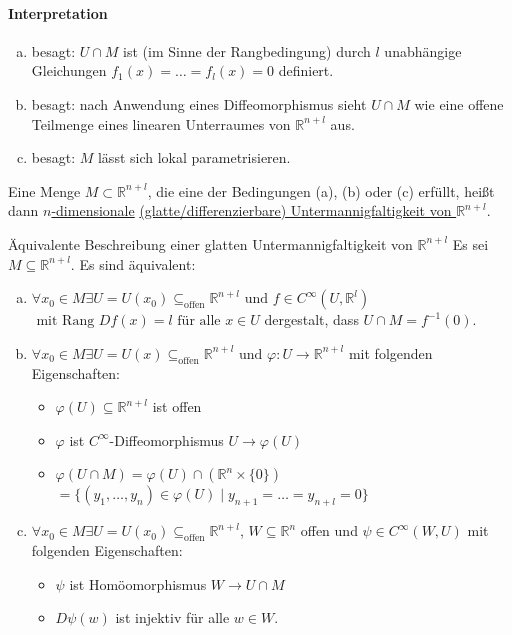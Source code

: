 \documentclass[a4paper,11pt,notitlepage]{report}
\theoremstyle{definition}
\newcommand{\R}{{\ensuremath{\mathbb{R}}}}
\newenvironment{definition}[1]{
	\begin{definitions}
	\marginnote{\emph{#1}}
}{\end{definitions}}
\begin{document}
\paragraph{Interpretation}
\begin{enumerate}[(a)]
	\item besagt: $U \cap M$ ist (im Sinne der Rangbedingung) durch $l$ unabhängige Gleichungen $f_1(x) = \ldots = f_l(x) = 0$ definiert.
	\item besagt: nach Anwendung eines Diffeomorphismus sieht $U \cap M$ wie eine offene Teilmenge eines linearen Unterraumes von $\R^{n+l}$ aus.
	\item besagt: $M$ lässt sich lokal parametrisieren.
\end{enumerate}

\begin{definition}{Untermannigfaltigkeit}
Eine Menge $M \subset \R^{n+l}$, die eine der Bedingungen (a), (b) oder (c) erfüllt, heißt dann \underline{$n$-dimensionale} \underline{(glatte/differenzierbare) Untermannigfaltigkeit von $\R^{n+l}$}.
\end{definition}


\begin{theorem}{Äquivalente Beschreibung einer glatten Untermannigfaltigkeit von $\R^{n+l}$}
	Es sei $M \subseteq \R^{n+l}$. Es sind äquivalent:
	\begin{enumerate}[(a)]
		\item $\forall x_0 \in M \exists U = U(x_0) \subseteq_{\text{offen}} \R^{n+l} \text{ und } f \in C^\infty(U,\R^l)$ $\text{ mit Rang }Df(x) = l \text{ für alle } x \in U$ dergestalt, dass $U \cap M = f^{-1}(0)$.
		\item $\forall x_0 \in M \exists U = U(x) \subseteq_{\text{offen}} \R^{n+l} \text{ und } \varphi \colon U \rightarrow \R^{n+l}$ mit folgenden Eigenschaften:
			\begin{itemize}
				\item $\varphi(U) \subseteq \R^{n+l}$ ist offen
				\item $\varphi$ ist $C^\infty$-Diffeomorphismus $U \rightarrow \varphi(U)$
				\item $\varphi(U \cap M) = \varphi(U) \cap (\R^n \times \{0\})$ $= \{(y_1, \ldots, y_n) \in \varphi(U) \mid y_{n+1} = \ldots = y_{n+l} = 0\}$
			\end{itemize}
		\item $\forall x_0 \in M \exists U = U(x_0) \subseteq_{\text{offen}} \R^{n+l}$, $W \subseteq \R^n$ offen und $\psi \in C^\infty(W,U)$ mit folgenden Eigenschaften:
			\begin{itemize}
				\item $\psi$ ist Homöomorphismus $W \rightarrow U \cap M$
				\item $D\psi(w)$ ist injektiv für alle $w \in W$.
			\end{itemize}
	\end{enumerate}
\end{theorem}
\end{document}
